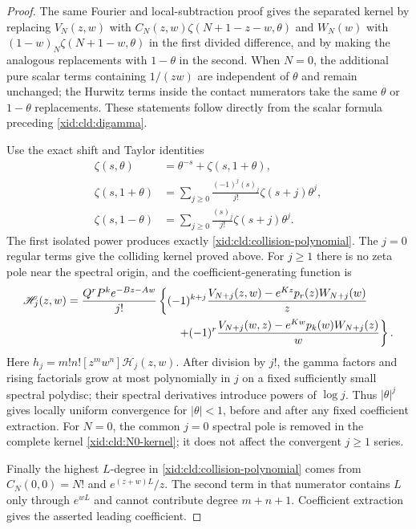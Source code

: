 \documentclass[11pt,a4paper]{article}
\numberwithin{equation}{section}
\theoremstyle{definition}
\theoremstyle{remark}
\begin{document}
\begin{proof}
The same Fourier and local-subtraction proof gives the separated kernel
by replacing $V_N(z,w)$ with
$C_N(z,w)\zeta(N+1-z-w,\theta)$ and $W_N(w)$ with
$(1-w)_N\zeta(N+1-w,\theta)$ in the first divided difference, and
by making the analogous replacements with $1-\theta$ in the second.
When $N=0$, the additional pure scalar terms containing $1/(zw)$
are independent of $\theta$ and remain unchanged; the Hurwitz terms
inside the contact numerators take the same $\theta$ or $1-\theta$
replacements. These statements follow directly from the scalar formula
preceding \eqref{xid:cld:digamma}.

Use the exact shift and Taylor identities
\begin{align*}
 \zeta(s,\theta)&=\theta^{-s}+\zeta(s,1+\theta),\\
 \zeta(s,1+\theta)&=\sum_{j\ge0}\frac{(-1)^j(s)_j}{j!}
                                      \zeta(s+j)\theta^j,\\
 \zeta(s,1-\theta)&=\sum_{j\ge0}\frac{(s)_j}{j!}
                                      \zeta(s+j)\theta^j.
\end{align*}
The first isolated power produces exactly
\eqref{xid:cld:collision-polynomial}.  The $j=0$ regular terms give the
colliding kernel proved above.  For $j\ge1$ there is no zeta pole near
the spectral origin, and the coefficient-generating function is
\begin{align}
 \mathscr H_j(z,w)
 ={}&\frac{Q^rP^ke^{-Bz-Aw}}{j!}
   \left\{(-1)^{k+j}
      \frac{V_{N+j}(z,w)-e^{Kz}p_r(z)W_{N+j}(w)}z\right.\notag\\
 &\hspace{30mm}\left.
    +(-1)^r
      \frac{V_{N+j}(w,z)-e^{Kw}p_k(w)W_{N+j}(z)}w\right\}.
 \label{xid:cld:regular-coefficients}
\end{align}
Here $h_j=m!n![z^mw^n]\mathscr H_j(z,w)$.
After division by $j!$, the gamma factors and rising factorials grow
at most polynomially in $j$ on a fixed sufficiently small spectral polydisc; their spectral
derivatives introduce powers of $\log j$.  Thus $|\theta|^j$ gives
locally uniform convergence for $|\theta|<1$, before and after any fixed
coefficient extraction.  For $N=0$, the common $j=0$ spectral pole is
removed in the complete kernel \eqref{xid:cld:N0-kernel}; it does not affect
the convergent $j\ge1$ series.

Finally the highest $L$-degree in
\eqref{xid:cld:collision-polynomial} comes from
$C_N(0,0)=N!$ and $e^{(z+w)L}/z$.  The second term in that numerator
contains $L$ only through $e^{wL}$ and cannot contribute degree
$m+n+1$.  Coefficient extraction gives the asserted leading coefficient.
\end{proof}
\end{document}
